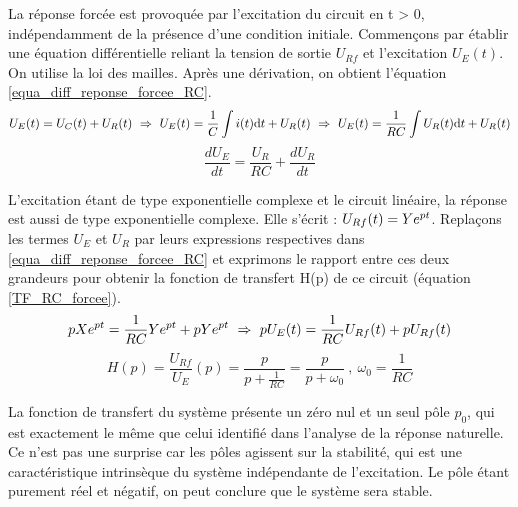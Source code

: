 \begin{remark}{}
        La réponse forcée est provoquée par l'excitation du circuit en
        t > 0, indépendamment de la présence d'une condition
        initiale. Commençons par établir une équation différentielle
        reliant la tension de sortie $U_{Rf}$ et l'excitation
        $U_{E}(t)$. On utilise la loi des mailles. Après une
        dérivation, on obtient l'équation
        \ref{equa_diff_reponse_forcee_RC}.
	\begin{equation*}\label{}
          U_{E}(t)=U_{C}(t)+U_{R}(t) ~ \Rightarrow ~ U_{E}(t)=\frac{1}{C}\int i(t) \mathrm{d{}} t+U_{R}(t)~ \Rightarrow ~U_{E}(t)=\frac{1}{RC}\int U_{R}(t) \mathrm{d{}} t+U_{R}(t)
	\end{equation*} 
	\begin{equation}\label{equa_diff_reponse_forcee_RC}
          \frac{dU_{E}}{dt}=\frac{U_{R}}{RC}+\frac{dU_{R}}{dt}
	\end{equation}

	L'excitation étant de type exponentielle complexe et le
        circuit linéaire, la réponse est aussi de type exponentielle
        complexe. Elle s'écrit : $U_{Rf}(t)=Ye^{pt}$. Replaçons les
        termes $U_{E}$ et $U_{R}$ par leurs expressions respectives
        dans \ref{equa_diff_reponse_forcee_RC} et exprimons le rapport
        entre ces deux grandeurs pour obtenir la fonction de transfert
        H(p) de ce circuit (équation \ref{TF_RC_forcee}).
	\begin{equation*}
          pXe^{pt}=\frac{1}{RC} Ye^{pt}+pYe^{pt} ~\Rightarrow~pU_{E}(t)=\frac{1}{RC}U_{Rf}(t)+pU_{Rf}(t)
	\end{equation*}
	\begin{equation}\label{TF_RC_forcee}
          H(p)=\frac{U_{Rf}}{U_{E}}(p)=\frac{p}{p+\frac{1}{RC}}=\frac{p}{p+\omega_{0}}~,~\omega_{0}=\frac{1}{RC}
	\end{equation}

	La fonction de transfert du système présente un zéro nul et un
        seul pôle $p_{0}$, qui est exactement le même que celui
        identifié dans l'analyse de la réponse naturelle. Ce n'est pas
        une surprise car les pôles agissent sur la stabilité, qui est
        une caractéristique intrinsèque du système indépendante de
        l'excitation. Le pôle étant purement réel et négatif, on peut
        conclure que le système sera stable.
		

\end{remark}
